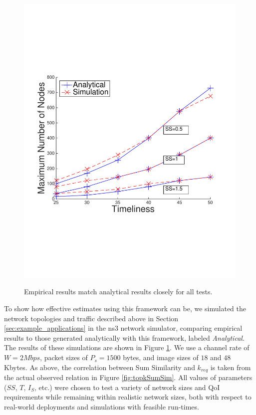 \begin{figure}[]
{        \includegraphics[scale=0.40, clip=true, trim=12mm 65mm 20mm 65mm]{figures/scal_sim_results/color_2d/grid_scal_chernoff.pdf}
        \label{fig:scal_vs_qoi_grid}
        }
   \caption{Empirical results match analytical results closely for all tests.}
   \label{fig:scal_vs_qoi}
\end{figure}

To show how effective estimates using this framework can be, we simulated the network topologies and traffic described above in Section \ref{sec:example_applications} in the ns3 network simulator, comparing empirical results to those generated analytically with this framework, labeled \emph{Analytical}.  The results of these simulations are shown in Figure \ref{fig:scal_vs_qoi}.
We use a channel rate of $W= 2 Mbps$, packet sizes of $P_s = 1500$ bytes, and image sizes of $18$ and $48$ Kbytes.  As above, the correlation between Sum Similarity and $k_{req}$ is taken from the actual observed relation in Figure \ref{fig:topkSumSim}.  All values of parameters ($SS$, $T$, $I_S$, etc.) were chosen to test a variety of network sizes and QoI requirements while remaining within realistic network sizes, both with respect to real-world deployments and simulations with feasible run-times.


